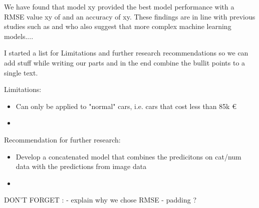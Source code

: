 \documentclass[12pt]{article}
\begin{document}
\noindent We have found that model xy provided the best model performance with a RMSE value xy of and an accuracy of xy. These findings are in line with previous studies such as \cite{} and \cite{} who also suggest that more complex machine learning models....


\noindent I started a list for Limitations and further research recommendations so we can add stuff while writing our parts and in the end combine the bullit points to a single text.

\noindent Limitations:
\begin{itemize}
    \item Can only be applied to "normal" cars, i.e. cars that cost less than 85k €
    \item 
\end{itemize}


\noindent Recommendation for further research:
\begin{itemize}
    \item Develop a concatenated model that combines the predicitons on cat/num data with the predictions from image data
    \item 
\end{itemize}


DON'T FORGET : 
- explain why we chose RMSE
- padding ?
\end{document}
